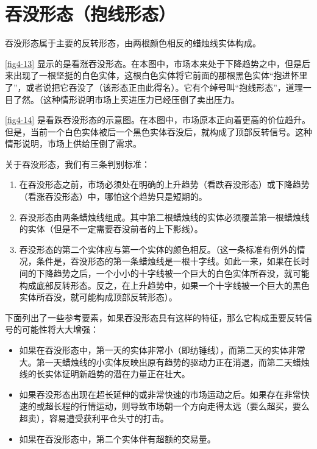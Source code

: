 \section{吞没形态（抱线形态）}
吞没形态属于主要的反转形态，由两根颜色相反的蜡烛线实体构成。

\autoref{fig4-13} 显示的是看涨吞没形态。在本图中，市场本来处于下降趋势之中，但是后来出现了一根坚挺的白色实体，这根白色实体将它前面的那根黑色实体“抱进怀里了”，或者说把它吞没了（该形态正由此得名）。它有个绰号叫“抱线形态”，道理一目了然。（这种情形说明市场上买进压力已经压倒了卖出压力。


\autoref{fig4-14} 是看跌吞没形态的示意图。在本图中，市场原本正向着更高的价位趋升。但是，当前一个白色实体被后一个黑色实体吞没后，就构成了顶部反转信号。这种情形说明，市场上供给压倒了需求。


关于吞没形态，我们有三条判别标准：
\begin{enumerate}
    \item 在吞没形态之前，市场必须处在明确的上升趋势（看跌吞没形态）或下降趋势（看涨吞没形态）中，哪怕这个趋势只是短期的。
    \item 吞没形态由两条蜡烛线组成。其中第二根蜡烛线的实体必须覆盖第一根蜡烛线的实体（但是不一定需要吞没前者的上下影线）。
    \item 吞没形态的第二个实体应与第一个实体的颜色相反。（这一条标准有例外的情况，条件是，吞没形态的第一条蜡烛线是一根十字线。如此一来，如果在长时间的下降趋势之后，一个小小的十字线被一个巨大的白色实体所吞没，就可能构成底部反转形态。反之，在上升趋势中，如果一个十字线被一个巨大的黑色实体所吞没，就可能构成顶部反转形态）。
\end{enumerate}

下面列出了一些参考要素，如果吞没形态具有这样的特征，那么它构成重要反转信号的可能性将大大增强：
\begin{itemize}
    \item 如果在吞没形态中，第一天的实体非常小（即纺锤线），而第二天的实体非常大。第一天蜡烛线的小实体反映出原有趋势的驱动力正在消退，而第二天蜡烛线的长实体证明新趋势的潜在力量正在壮大。
    \item 如果吞没形态出现在超长延伸的或非常快速的市场运动之后。如果存在非常快速的或超长程的行情运动，则导致市场朝一个方向走得太远（要么超买，要么超卖），容易遭受获利平仓头寸的打击。
    \item 如果在吞没形态中，第二个实体伴有超额的交易量。
\end{itemize}